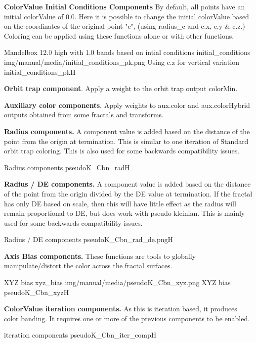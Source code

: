\textbf{ColorValue Initial Conditions Components}
By default, all points have an initial colorValue of 0.0. Here it is possible to change the initial colorValue based on the coordinates of the original point "c", (using radius\_c and c.x, c.y \& c.z.) Coloring can be applied using these functions alone or with other functions.

{Mandelbox 12.0 high with 1.0 bands based on intial conditions}
{initial_conditions}
{img/manual/media/initial_conditions_pk.png}
{Using c.z for vertical variation}
{initial_conditions_pk}{H}

\textbf{Orbit trap component}. Apply a weight to the orbit trap output colorMin.

\textbf{Auxillary color components}. Apply weights to aux.color and aux.colorHybrid outputs obtained from some fractals and transforms.

\textbf{Radius components.} A component value is added based on the distance of the point from the origin at termination.
This is similar to one iteration of Standard orbit trap coloring. This is also used for some backwards compatibility issues.

{Radius components}
{pseudoK_Cbn_rad}{H}

\textbf{Radius / DE components.} A component value is added based on the distance of the point from the origin divided by the DE value at termination. If the fractal has only DE based on scale, then this will have little effect as the radius will remain proportional to DE, but does work with pseudo kleinian. This is mainly used for some backwards compatibility issues.

{Radius / DE components}
{pseudoK_Cbn_rad_de.png}{H}

\textbf{Axis Bias components.} These functions are tools to globally manipulate/distort the color across the fractal surfaces.
 
{XYZ bias}
{xyz_bias}
{img/manual/media/pseudoK_Cbn_xyz.png}
{XYZ bias}
{pseudoK_Cbn_xyz}{H}

\textbf{ColorValue iteration components.} As this is iteration based, it produces color banding. It requires one or more of the previous components to be enabled.

{iteration components}
{pseudoK_Cbn_iter_comp}{H}

